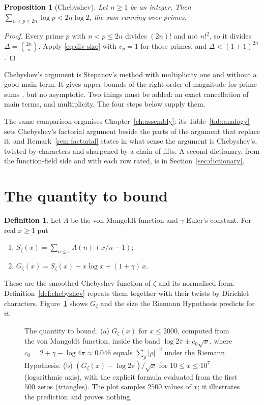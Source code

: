 \documentclass[11pt]{amsbook}
\theoremstyle{plain}
\newtheorem{proposition}[theorem]{Proposition}
\theoremstyle{definition}
\newtheorem{definition}[theorem]{Definition}
\theoremstyle{remark}
\numberwithin{equation}{section}
\numberwithin{figure}{chapter}
\numberwithin{table}{chapter}
\newcommand{\Gz}{G_{\zeta}}
\newcommand{\Sz}{S_{\zeta}}
\begin{document}
\begin{proposition}[Chebyshev]\label{prop:chebyshev}
Let $n \ge 1$ be an integer. Then
$\sum_{n < p \le 2n} \log p < 2n \log 2$, the sum running over
primes.
\end{proposition}

\begin{proof}
Every prime $p$ with $n < p \le 2n$ divides $(2n)!$ and not $n!^2$,
so it divides $\Delta = \binom{2n}{n}$. Apply \eqref{eq:div-size}
with $v_p = 1$ for those primes, and $\Delta < (1+1)^{2n}$.
\end{proof}

Chebyshev's argument is Stepanov's method with multiplicity one and
without a good main term. It gives upper bounds of the right order
of magnitude for prime sums \cite{Chebyshev1852}, but no asymptotic.
Two things must be added: an exact cancellation of main terms, and
multiplicity. The four steps below supply them.

The same comparison organises Chapter~\ref{ch:assembly}: its
Table~\ref{tab:analogy} sets Chebyshev's factorial argument beside
the parts of the argument that replace it, and
Remark~\ref{rem:factorial} states in what sense the argument is
Chebyshev's, twisted by characters and sharpened by a chain of
lifts. A second dictionary, from the function-field side and with
each row rated, is in Section~\ref{sec:dictionary}.

\section{The quantity to bound}\label{sec:idea-landau}

\begin{definition}\label{def:sz-gz}
Let $\Lambda$ be the von Mangoldt function and $\gamma$ Euler's
constant. For real $x \ge 1$ put
\begin{enumerate}[label=(\roman*)]
\item $\Sz(x) = \sum_{n \le x} \Lambda(n)\,(x/n - 1)$;
\item $\Gz(x) = \Sz(x) - x\log x + (1 + \gamma)\,x$.
\end{enumerate}
\end{definition}

These are the smoothed Chebyshev function of $\zeta$ and its
normalised form. Definition~\ref{def:chebyshev} repeats them
together with their twists by Dirichlet characters.
Figure~\ref{fig:gz-size} shows $\Gz$ and the size the Riemann
Hypothesis predicts for it.
\begin{figure}[tbp]
\centering
{}
\caption{The quantity to bound. (a) $\Gz(x)$ for $x\le2000$, computed from
the von Mangoldt function, inside the band
$\log2\pi\pm c_0\sqrt x$, where
$c_0=2+\gamma-\log4\pi\approx0.046$ equals $\sum_\rho|\rho|^{-2}$
under the Riemann Hypothesis. (b) $(\Gz(x)-\log2\pi)/\sqrt x$ for
$10\le x\le10^7$ (logarithmic axis), with the explicit formula
evaluated from the first $500$ zeros (triangles). The plot samples
$2500$ values of $x$; it illustrates the prediction and proves
nothing.}
\label{fig:gz-size}
\end{figure}
\end{document}
